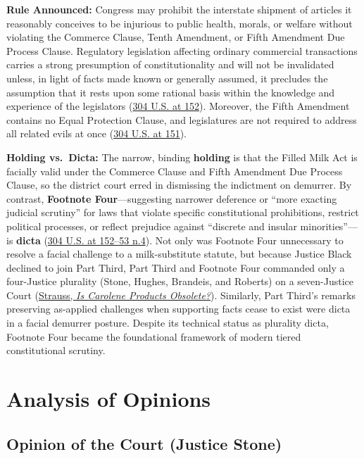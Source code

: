 \documentclass[12pt]{article}
\begin{document}
\textbf{Rule Announced:} Congress may prohibit the interstate shipment of articles it reasonably conceives to be injurious to public health, morals, or welfare without violating the Commerce Clause, Tenth Amendment, or Fifth Amendment Due Process Clause. Regulatory legislation affecting ordinary commercial transactions carries a strong presumption of constitutionality and will not be invalidated unless, in light of facts made known or generally assumed, it precludes the assumption that it rests upon some rational basis within the knowledge and experience of the legislators (\href{https://supreme.justia.com/cases/federal/us/304/144/}{304 U.S. at 152}). Moreover, the Fifth Amendment contains no Equal Protection Clause, and legislatures are not required to address all related evils at once (\href{https://supreme.justia.com/cases/federal/us/304/144/}{304 U.S. at 151}).

\textbf{Holding vs.~Dicta:} The narrow, binding \textbf{holding} is that the Filled Milk Act is facially valid under the Commerce Clause and Fifth Amendment Due Process Clause, so the district court erred in dismissing the indictment on demurrer. By contrast, \textbf{Footnote Four}---suggesting narrower deference or ``more exacting judicial scrutiny'' for laws that violate specific constitutional prohibitions, restrict political processes, or reflect prejudice against ``discrete and insular minorities''---is \textbf{dicta} (\href{https://supreme.justia.com/cases/federal/us/304/144/}{304 U.S. at 152--53 n.4}). Not only was Footnote Four unnecessary to resolve a facial challenge to a milk-substitute statute, but because Justice Black declined to join Part Third, Part Third and Footnote Four commanded only a four-Justice plurality (Stone, Hughes, Brandeis, and Roberts) on a seven-Justice Court (\href{https://chicagounbound.uchicago.edu/cgi/viewcontent.cgi?article=2988&context=journal_articles}{Strauss, \textit{Is Carolene Products Obsolete?}}). Similarly, Part Third's remarks preserving as-applied challenges when supporting facts cease to exist were dicta in a facial demurrer posture. Despite its technical status as plurality dicta, Footnote Four became the foundational framework of modern tiered constitutional scrutiny.

\section{Analysis of Opinions}

\subsection{Opinion of the Court (Justice Stone)}
\end{document}
